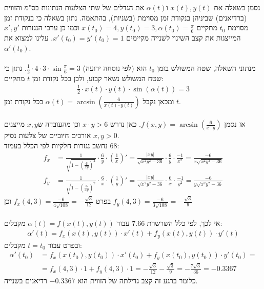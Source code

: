 \documentclass{article}
\begin{document}
נסמן בשאלה את $x(t), y(t)$ ו$\alpha(t)$ את הגדלים של שתי הצלעות הנתונות בס"מ והזווית (ברדיאנים) שביניהן בנקודת זמן מסוימת (בשניות), בהתאמה. נתון בשאלה כי בנקודת זמן מסוימת $t_0$ מתקיים $x(t_0)=4, y(t_0)=3, \alpha(t_0)=\frac{\pi}{6}$ וכמו כן ערכי הנגזרות $x', y'$ המייצגות את קצב השינוי לשנייה מקיימים $x'(t_0)=y'(t_0)=1$.
עלינו למצוא את $\alpha'(t_0)$.
\\\\
מנתוני השאלה, שטח המשולש בזמן $t_0$ הוא (לפי נוסחה ידועה) $\frac{1}{2}\cdot 4\cdot 3 \cdot \sin \frac{\pi}{6}=3$. נתון כי שטח המשולש נשאר קבוע, ולכן בכל נקודת זמן $t$ מתקיים:
\begin{align*}
    \frac{1}{2} \cdot x(t) \cdot y(t) \cdot \sin(\alpha(t))=3
\end{align*}
ומכאן נקבל $\alpha(t)=\arcsin\left(\frac{6}{x(t)\cdot y(t)}\right)$ בכל נקודת זמן $t$.
\\\\
אז נסמן $f(x,y)=\arcsin\left(\frac{6}{x\cdot y}\right)$. כאן נדרש $x\cdot y > 6$ וכן מהעובדה ש$x,y$ מייצגים אורכים חיוביים של צלעות נסיק $x,y>0$. \\
נחשב נגזרות חלקיות לפי הכלל בעמוד $68$:
\begin{align*}
    f_x & =
    \frac{1}{\sqrt{1-(\frac{6}{xy})^2}} \cdot \frac{6}{y}\cdot (\frac{1}{x})' =
    \frac{|xy|}{\sqrt{x^2y^2-36}} \cdot \frac{6}{y}\cdot \frac{-1}{x^2} =
    \frac{-6}{x\sqrt{x^2y^2-36}} \\
    f_y & =
    \frac{1}{\sqrt{1-(\frac{6}{xy})^2}} \cdot \frac{6}{x}\cdot (\frac{1}{y})' =
    \frac{|xy|}{\sqrt{x^2y^2-36}} \cdot \frac{6}{x}\cdot \frac{-1}{y^2} =
    \frac{-6}{y\sqrt{x^2y^2-36}}
\end{align*}
בפרט $f_x(4,3)=\frac{-6}{4\sqrt{108}}=-\frac{\sqrt{3}}{12}$ וכן $f_y(4,3)=\frac{-6}{3\sqrt{108}}=-\frac{\sqrt{3}}{9}$
\\\\
אי לכך, לפי כלל השרשרת 7.66 עבור $\alpha(t)=f(x(t), y(t))$ מקבלים:
\begin{align*}
    \alpha'(t)=f_x(x(t), y(t))\cdot x'(t)+f_y(x(t), y(t))\cdot y'(t)
\end{align*}
ובפרט עבור $t=t_0$ מקבלים:
\begin{align*}
    \alpha'(t_0) & =f_x(x(t_0), y(t_0))\cdot x'(t_0)+f_y(x(t_0), y(t_0))\cdot y'(t_0)=                                            \\
                 & = f_x(4,3)\cdot 1 + f_y(4,3)\cdot 1= -\frac{\sqrt{3}}{12} - \frac{\sqrt{3}}{9} = -\frac{7\sqrt{3}}{36}=-0.3367
\end{align*}
כלומר ברגע זה קצב גדילתה של הזווית הוא $-0.3367$ רדיאנים בשנייה.
\end{document}
